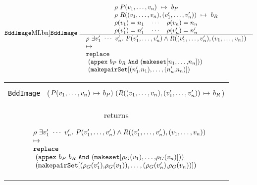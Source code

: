 \documentclass[12pt]{article}
\newcommand{\bnind}[1]{\index[MLbn]{#1}}
\newlength{\minipagewidth}
\newcommand{\ml}[1]{{\tt #1}}
\newcommand{\termbdd}[3]{\mbox{$#1~#2~\mapsto~#3$}}
\newcommand{\globtermbdd}[2]{\mbox{$#1\hspace{0.5mm}\mapsto\hspace{0.5mm}#2$}}
\newcommand\termbddty{\texttt{term\_bdd}\xspace}
\newcommand\fun{\mbox{\tt{->}}}
\begin{document}
$\raisebox{3mm}{\ml{BddImage}\bnind{\ml{BddImage}}}~\begin{array}{c}
\begin{array}{l}
\termbdd{\rho}{P(v_1,\ldots,v_n)}{b_P} \\
\termbdd{\rho}{R((v_1,\ldots,v_n),(v'_1,\ldots,v'_n))}{b_R}\\
\rho(v_1)=n_1 \quad \cdots \quad \rho(v_n)=n_n\\
\rho(v'_1)=n'_1 \quad \cdots \quad \rho(v'_n)=n'_n
\end{array}
\\ \hline
\begin{array}{l}
{\rho}~
{\exists v'_1~\cdots~v'_n.~ P(v'_1,\ldots,v'_n) \wedge R((v'_1,\ldots,v'_n),(v_1,\ldots,v_n))}\\
\mapsto\\
\ml{replace}\\
~(\ml{appex}~b_P~b_R~\ml{And}~\ml{(makeset[}n_1\ml{,}\ldots\ml{,}n_n\ml{])})\\
~(\ml{makepairSet[(}n'_1\ml{,}n_1\ml{),}\ldots\ml{,(}n'_n\ml{,}n_n\ml{)]})
\end{array}
\end{array}$

\smallskip

\vspace*{-4mm}
\begin{flushleft}
\begin{tabular}{|c|}\hline
\begin{minipage}{\minipagewidth}
\smallskip
\begin{footnotesize}
\begin{description}

\item $\ml{BddImage} : \termbddty\fun\termbddty\fun\termbddty$\\
\ml{BddImage}~
($\globtermbdd{P(v_1,\ldots,v_n)}{b_P})~ 
(\globtermbdd{R((v_1,\ldots,v_n),(v'_1,\ldots,v'_n))}{b_R}$)\\
returns

\smallskip

\mbox{}~ $\begin{array}{l}
{\rho}~
{\exists v'_1~\cdots~v'_n.~ P(v'_1,\ldots,v'_n) \wedge R((v'_1,\ldots,v'_n),(v_1,\ldots,v_n))}\\
\mapsto\\
\ml{replace}\\
~(\ml{appex}~b_P~b_R~\ml{And}~\ml{(makeset[}\rho_G(v_1)\ml{,}\ldots\ml{,}\rho_G(v_n)\ml{])})\\
~(\ml{makepairSet[(}\rho_G(v'_1)\ml{,}\rho_G(v_1)\ml{),}\ldots\ml{,(}\rho_G(v'_n)\ml{,}\rho_G(v_n)\ml{)]})
\end{array}$


\end{description}
\end{footnotesize}
\smallskip
\end{minipage}\\ \hline
\end{tabular}
\end{flushleft}
\end{document}
